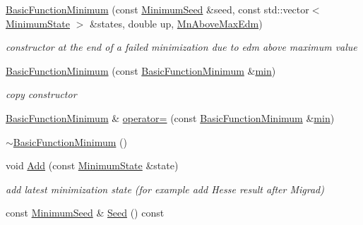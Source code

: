 \begin{DoxyCompactItemize}
\mbox{\hyperlink{classROOT_1_1Minuit2_1_1BasicFunctionMinimum_ae30a460175a2bbf715f3ee0d6092c8b6}{Basic\+Function\+Minimum}} (const \mbox{\hyperlink{classROOT_1_1Minuit2_1_1MinimumSeed}{Minimum\+Seed}} \&seed, const std\+::vector$<$ \mbox{\hyperlink{classROOT_1_1Minuit2_1_1MinimumState}{Minimum\+State}} $>$ \&states, double up, \mbox{\hyperlink{classROOT_1_1Minuit2_1_1BasicFunctionMinimum_1_1MnAboveMaxEdm}{Mn\+Above\+Max\+Edm}})
\begin{DoxyCompactList}\small\item\em constructor at the end of a failed minimization due to edm above maximum value \end{DoxyCompactList}\item 
\mbox{\hyperlink{classROOT_1_1Minuit2_1_1BasicFunctionMinimum_ae0812dcb933989ffd9e096792367d0b7}{Basic\+Function\+Minimum}} (const \mbox{\hyperlink{classROOT_1_1Minuit2_1_1BasicFunctionMinimum}{Basic\+Function\+Minimum}} \&\mbox{\hyperlink{adat__devel_2lib_2SU3_2SU3__internal_8h_ab0f5fed3171eb00d1c5f037d9f518a23}{min}})
\begin{DoxyCompactList}\small\item\em copy constructor \end{DoxyCompactList}\item 
\mbox{\hyperlink{classROOT_1_1Minuit2_1_1BasicFunctionMinimum}{Basic\+Function\+Minimum}} \& \mbox{\hyperlink{classROOT_1_1Minuit2_1_1BasicFunctionMinimum_ad143c1c314e041649151bac9bb9e7a91}{operator=}} (const \mbox{\hyperlink{classROOT_1_1Minuit2_1_1BasicFunctionMinimum}{Basic\+Function\+Minimum}} \&\mbox{\hyperlink{adat__devel_2lib_2SU3_2SU3__internal_8h_ab0f5fed3171eb00d1c5f037d9f518a23}{min}})
\item 
\mbox{\hyperlink{classROOT_1_1Minuit2_1_1BasicFunctionMinimum_a8ed0b5582b668d53022197f2540df4e7}{$\sim$\+Basic\+Function\+Minimum}} ()
\item 
void \mbox{\hyperlink{classROOT_1_1Minuit2_1_1BasicFunctionMinimum_abd32f932e7a26883723b33c4a1402a85}{Add}} (const \mbox{\hyperlink{classROOT_1_1Minuit2_1_1MinimumState}{Minimum\+State}} \&state)
\begin{DoxyCompactList}\small\item\em add latest minimization state (for example add Hesse result after Migrad) \end{DoxyCompactList}\item 
const \mbox{\hyperlink{classROOT_1_1Minuit2_1_1MinimumSeed}{Minimum\+Seed}} \& \mbox{\hyperlink{classROOT_1_1Minuit2_1_1BasicFunctionMinimum_a925aba07b861d7b3d1e5386411a5ea2f}{Seed}} () const

\end{DoxyCompactItemize}
